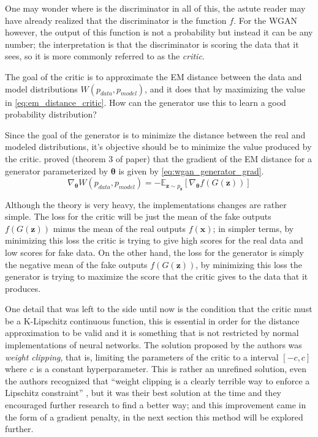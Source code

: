 One may wonder where is the discriminator in all of this, the astute reader may have already realized that the discriminator is the function $f$. For the \gls{WGAN} however, the output of this function is not a probability but instead it can be any number; the interpretation is that the discriminator is scoring the data that it sees, so it is more commonly referred to as the \textit{critic}.

The goal of the critic is to approximate the \gls{EM} distance between the data and model distributions $W(p_{data}, p_{model})$, and it does that by maximizing the value in \autoref{eq:em_distance_critic}. How can the generator use this to learn a good probability distribution?

Since the goal of the generator is to minimize the distance between the real and modeled distributions, it's objective should be to minimize the value produced by the critic. \textcite{wasserstein2017} proved (theorem 3 of paper) that the gradient of the \gls{EM} distance for a generator parameterized by $\bm{\theta}$ is given by \autoref{eq:wgan_generator_grad}.
\begin{equation} \label{eq:wgan_generator_grad}
    \nabla_{\bm{\theta}} W(p_{data}, p_{model}) = -\mathbb{E}_{\bm{z}\sim p_{\bm{z}}}{
        \left\lbrack \nabla_{\bm{\theta}}f(G(\bm{z})) \right\rbrack
    }
\end{equation}

Although the theory is very heavy, the implementations changes are rather simple. The loss for the critic will be just the mean of the fake outputs $f(G(\bm{z}))$ minus the mean of the real outputs $f(\bm{x})$; in simpler terms, by minimizing this loss the critic is trying to give high scores for the real data and low scores for fake data. On the other hand, the loss for the generator is simply the negative mean of the fake outputs $f(G(\bm{z}))$, by minimizing this loss the generator is trying to maximize the score that the critic gives to the data that it produces.

One detail that was left to the side until now is the condition that the critic must be a K-Lipschitz continuous function, this is essential in order for the distance approximation to be valid and it is something that is not restricted by normal implementations of neural networks. The solution proposed by the authors was \textit{weight clipping}, that is, limiting the parameters of the critic to a interval $\left\lbrack-c, c\right\rbrack$ where $c$ is a constant hyperparameter. This is rather an unrefined solution, even the authors recognized that ``weight clipping is a clearly terrible way to enforce a Lipschitz constraint'' \cite{wasserstein2017}, but it was their best solution at the time and they encouraged further research to find a better way; and this improvement came in the form of a gradient penalty, in the next section this method will be explored further.

